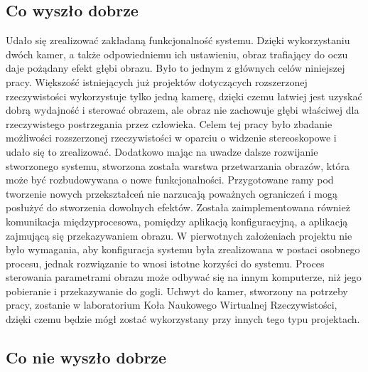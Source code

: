 \documentclass[a4paper,11pt,twoside]{report}
\theoremstyle{definition}
\begin{document}
\subsection{Co wyszło dobrze}

Udało się zrealizować zakładaną funkcjonalność systemu. Dzięki wykorzystaniu dwóch kamer, a także odpowiedniemu ich ustawieniu, obraz trafiający do oczu daje pożądany efekt głębi obrazu. Było to jednym z głównych celów niniejszej pracy. Większość istniejących już projektów dotyczących rozszerzonej rzeczywistości wykorzystuje tylko jedną kamerę, dzięki czemu łatwiej jest uzyskać dobrą wydajność i sterować obrazem, ale obraz nie zachowuje głębi właściwej dla rzeczywistego postrzegania przez człowieka. Celem tej pracy było zbadanie możliwości rozszerzonej rzeczywistości w oparciu o widzenie stereoskopowe i udało się to zrealizować. Dodatkowo mając na uwadze dalsze rozwijanie stworzonego systemu, stworzona została warstwa przetwarzania obrazów, która może być rozbudowywana o nowe funkcjonalności. Przygotowane ramy pod tworzenie nowych przekształceń nie narzucają poważnych ograniczeń i mogą posłużyć do stworzenia dowolnych efektów. Została zaimplementowana również komunikacja międzyprocesowa, pomiędzy aplikacją konfiguracyjną, a aplikacją zajmującą się przekazywaniem obrazu. W pierwotnych założeniach projektu nie było wymagania, aby konfiguracja systemu była zrealizowana w postaci osobnego procesu, jednak rozwiązanie to wnosi istotne korzyści do systemu. Proces sterowania parametrami obrazu może odbywać się na innym komputerze, niż jego pobieranie i przekazywanie do gogli.
Uchwyt do kamer, stworzony na potrzeby pracy, zostanie w laboratorium Koła Naukowego Wirtualnej Rzeczywistości, dzięki czemu będzie mógł zostać wykorzystany przy innych tego typu projektach.

\subsection{Co nie wyszło dobrze}
\end{document}
